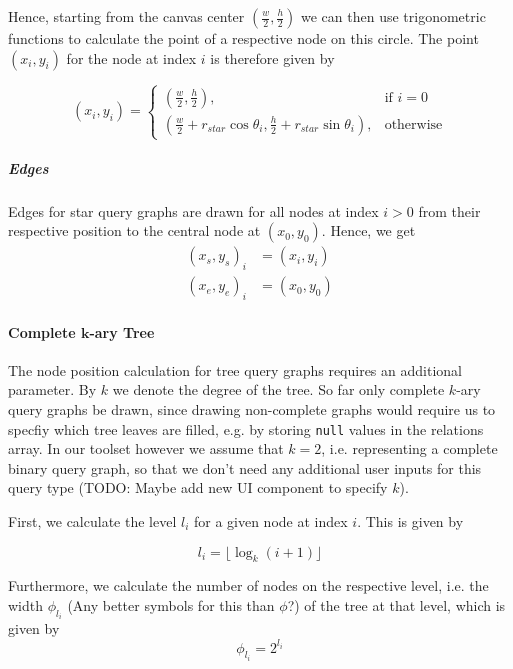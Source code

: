 Hence, starting from the canvas center $(\frac{w}{2}, \frac{h}{2})$ we can then use trigonometric functions to calculate the point of a respective node on this circle.
The point $(x_i, y_i)$ for the node at index $i$ is therefore given by

\begin{equation}
    (x_i, y_i) = 
    \begin{cases}
        (\frac{w}{2}, \frac{h}{2}),& \text{if } i = 0\\
        (\frac{w}{2} + r_{star}\cos{\theta_i}, \frac{h}{2} + r_{star}\sin{\theta_i}), & \text{otherwise}
    \end{cases}
\end{equation}

\subparagraph{Edges}
Edges for star query graphs are drawn for all nodes at index $i > 0$ from their respective position to the central node at $(x_0, y_0)$. Hence, we get 
\begin{equation}
    \begin{aligned}
        (x_s, y_s)_i &= (x_i, y_i)\\   
        (x_e, y_e)_i &= (x_{0}, y_{0})
    \end{aligned}
\end{equation}

\paragraph{Complete $\mathbf{k}$-ary Tree}

The node position calculation for tree query graphs requires an additional parameter. 
By $k$ we denote the degree of the tree. So far only complete $k$-ary query graphs be drawn, since drawing non-complete graphs would require us to specfiy which tree leaves are filled, e.g. by storing \texttt{null} values in the relations array. In our toolset however we assume that $k = 2$, i.e. representing a complete binary query graph, so that we don't need any additional user inputs for this query type (TODO: Maybe add new UI component to specify $k$).

First, we calculate the level $l_i$ for a given node at index $i$. This is given by

\begin{equation}
    \label{eq:qg-tree-level}
    l_i = \lfloor \log_{k}(i+1)\rfloor
\end{equation}

Furthermore, we calculate the number of nodes on the respective level, i.e. the width $\phi_{l_i}$ (Any better symbols for this than $\phi$?) of the tree at that level, which is given by
\begin{equation}
    \phi_{l_i} = 2^{l_i}
\end{equation}

